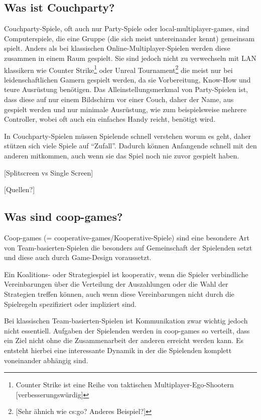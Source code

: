 \subsection{Was ist Couchparty?\label{_party_games}}


Couchparty-Spiele, oft auch nur Party-Spiele oder local-multiplayer-games, sind Computerspiele, die eine Gruppe (die sich meist untereinander kennt) gemeinsam spielt. Anders als bei klassischen Online-Multiplayer-Spielen werden diese zusammen in einem Raum gespielt. Sie sind jedoch nicht zu verwechseln mit LAN klassikern wie Counter Strike\footnote{Counter Strike ist eine Reihe von taktischen Multiplayer-Ego-Shootern [verbesserungswürdig]} oder Unreal Tournament\footnote{[Sehr ähnich wie cs:go? Anderes Beispiel?]} die meist nur bei leidenschaftlichen Gamern gespielt werden, da sie Vorbereitung, Know-How und teure Ausrüstung benötigen. Das Alleinstellungsmerkmal von Party-Spielen ist, dass diese auf nur einem Bildschirm vor einer Couch, daher der Name, aus gespielt werden und nur minimale Ausrüstung, wie zum beispielsweise mehrere Controller, wobei oft auch ein einfaches Handy reicht, benötigt wird.

In Couchparty-Spielen müssen Spielende schnell verstehen worum es geht, daher stützen sich viele Spiele auf "`Zufall"'. Dadurch können Anfangende schnell mit den anderen mitkommen, auch wenn sie das Spiel noch nie zuvor gespielt haben.

[Splitscreen vs Single Screen]

[Quellen?]

\subsection{Was sind coop-games?}

Coop-games (= cooperative-games/Kooperative-Spiele) sind eine besondere Art von Team-basierten-Spielen die besonders auf Gemeinschaft der Spielenden setzt und diese auch durch Game-Design voraussetzt. 

Ein Koalitions- oder Strategiespiel ist kooperativ, wenn die Spieler verbindliche Vereinbarungen über die Verteilung der Auszahlungen oder die Wahl der Strategien treffen können, auch wenn diese Vereinbarungen nicht durch die Spielregeln spezifiziert oder impliziert sind.\cite{_introduction_to_the_theory_of_cooperative_games}

Bei klassischen Team-basierten-Spielen ist Kommunikation zwar wichtig jedoch nicht essentiell. Aufgaben der Spielenden werden in coop-games so verteilt, dass ein Ziel nicht ohne die Zusammenarbeit der anderen erreicht werden kann. Es entsteht hierbei eine interessante Dynamik in der die Spielenden komplett voneinander abhängig sind. 

